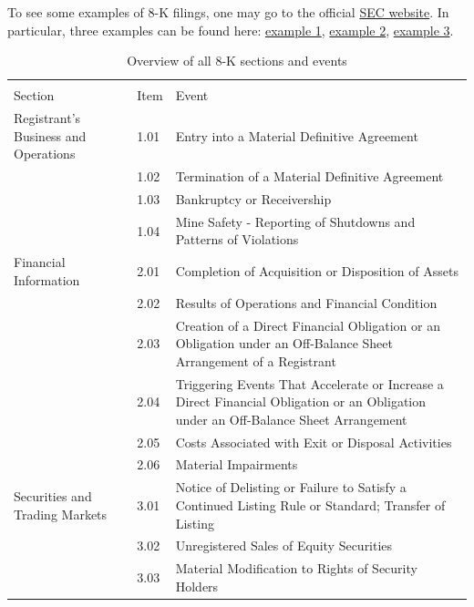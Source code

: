 \documentclass{article}
\begin{document}
	To see some examples of 8-K filings, one may go to the official  \href{https://www.sec.gov/cgi-bin/browse-edgar?company=&CIK=&type=8-K&owner=include&count=40&action=getcurrent}{SEC website}. In particular, three examples can be found here: \href{https://www.sec.gov/ix?doc=/Archives/edgar/data/1339947/000119312519299728/d840037d8k.htm}{example 1}, \href{https://www.sec.gov/Archives/edgar/data/883975/000149315219018330/form8-k.htm}{example 2}, \href{https://www.sec.gov/Archives/edgar/data/1419275/000118518519001650/greenbox20191125_8k.htm}{example 3}.
	
	\begin{table}[h!]
		\centering
		\caption{Overview of all 8-K sections and events}
		\label{table:8kevents}
		
		\begin{tabularx}{\textwidth}{|X|l|X|}
			\toprule
			&      &                                   \\
			Section & Item & Event \\
			\midrule
			Registrant's Business and Operations & 1.01 & Entry into a Material Definitive Agreement \\
			& 1.02 & Termination of a Material Definitive Agreement \\
			& 1.03 & Bankruptcy or Receivership \\
			& 1.04 & Mine Safety - Reporting of Shutdowns and Patterns of Violations \\
			Financial Information & 2.01 & Completion of Acquisition or Disposition of Assets \\
			& 2.02 & Results of Operations and Financial Condition \\
			& 2.03 & Creation of a Direct Financial Obligation or an Obligation under an Off-Balance Sheet Arrangement of a Registrant \\
			& 2.04 & Triggering Events That Accelerate or Increase a Direct Financial Obligation or an Obligation under an Off-Balance Sheet Arrangement \\
			& 2.05 & Costs Associated with Exit or Disposal Activities \\
			& 2.06 & Material Impairments \\
			Securities and Trading Markets & 3.01 & Notice of Delisting or Failure to Satisfy a Continued Listing Rule or Standard; Transfer of Listing \\
			& 3.02 & Unregistered Sales of Equity Securities \\
			& 3.03 & Material Modification to Rights of Security Holders \\

\end{tabularx}
\end{table}
\end{document}
